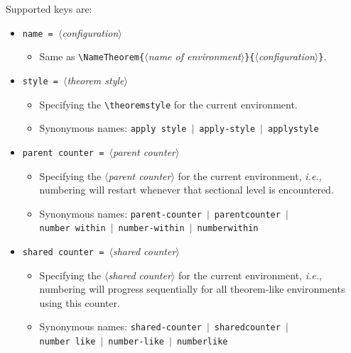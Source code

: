 \documentclass[classical]{einfart}
\providecommand{\meta}[1]{$\langle${\normalfont\itshape#1}$\rangle$}
\newcommand{\commandoption}[1]{\texttt{\textcolor{black!67!cyan}{#1}}}
\begin{document}
Supported keys are:
\vspace{-.2\baselineskip}
\begin{itemize}
    \item \commandoption{name}\lstinline| = |\meta{configuration}
        \begin{itemize}
            \item Same as \lstinline|\NameTheorem{|\meta{name of environment}\lstinline|}{|\meta{configuration}\lstinline|}|.
        \end{itemize}
    \item \commandoption{style}\lstinline| = |\meta{theorem style}
        \begin{itemize}
            \item Specifying the \lstinline|\theoremstyle| for the current environment.
            \item Synonymous names: \commandoption{apply style} \,$|$\, \commandoption{apply-style} \,$|$\, \commandoption{applystyle}
        \end{itemize}
    \item \commandoption{parent counter}\lstinline| = |\meta{parent counter}
        \begin{itemize}
            \item Specifying the \meta{parent counter} for the current environment, \emph{i.e.}, numbering will restart whenever that sectional level is encountered.
            \item Synonymous names: \commandoption{parent-counter} \,$|$\, \commandoption{parentcounter} \,$|$\, \\\phantom{Synonymous names: }\commandoption{number within} \,$|$\, \commandoption{number-within} \,$|$\, \commandoption{numberwithin}
        \end{itemize}
    \item \commandoption{shared counter}\lstinline| = |\meta{shared counter}
        \begin{itemize}
            \item Specifying the \meta{shared counter} for the current environment, \emph{i.e.}, numbering will progress sequentially for all theorem-like environments using this counter.
            \item Synonymous names: \commandoption{shared-counter} \,$|$\, \commandoption{sharedcounter} \,$|$\, \\\phantom{Synonymous names: }\commandoption{number like} \,$|$\, \commandoption{number-like} \,$|$\, \commandoption{numberlike}
        \end{itemize}

\end{itemize}
\end{document}
